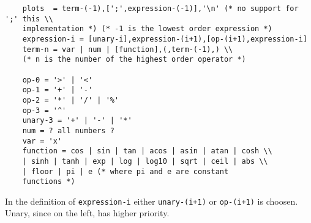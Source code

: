 \begin{verbatim}
    plots  = term-(-1),[';',expression-(-1)],'\n' (* no support for ';' this \\
    implementation *) (* -1 is the lowest order expression *)
    expression-i = [unary-i],expression-(i+1),[op-(i+1),expression-i]
    term-n = var | num | [function],(,term-(-1),) \\
    (* n is the number of the highest order operator *)

    op-0 = '>' | '<'
    op-1 = '+' | '-'
    op-2 = '*' | '/' | '%'
    op-3 = '^'
    unary-3 = '+' | '-' | '*' 
    num = ? all numbers ?
    var = 'x'
    function = cos | sin | tan | acos | asin | atan | cosh \\
    | sinh | tanh | exp | log | log10 | sqrt | ceil | abs \\
    | floor | pi | e (* where pi and e are constant
    functions *)
\end{verbatim}
In the definition of \texttt{expression-i} either \texttt{unary-(i+1)} or
\texttt{op-(i+1)} is choosen. Unary, since on the left, has higher priority.

